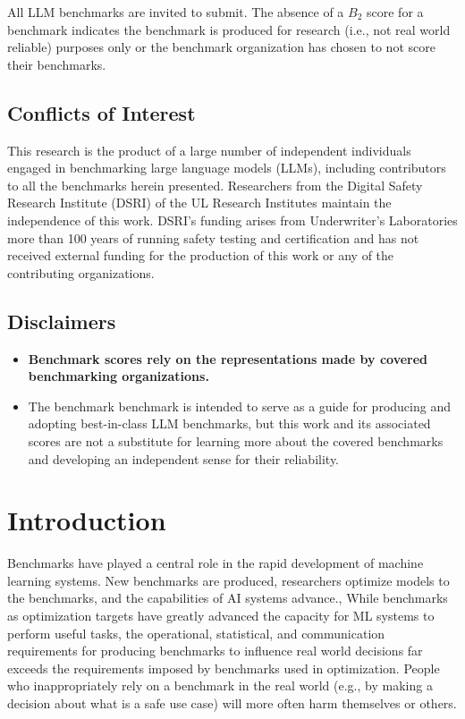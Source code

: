 \documentclass{article}
\begin{document}
All LLM benchmarks are invited to submit. The absence of a \(B_2\) score for a benchmark indicates the benchmark is produced for research (i.e., not real world reliable) purposes only or the benchmark organization has chosen to not score their benchmarks.

\subsection{Conflicts of Interest}
This research is the product of a large number of independent individuals engaged in benchmarking large language models (LLMs), including contributors to all the benchmarks herein presented. Researchers from the Digital Safety Research Institute (DSRI) of the UL Research Institutes maintain the independence of this work. DSRI's funding arises from Underwriter's Laboratories more than 100 years of running safety testing and certification and has not received external funding for the production of this work or any of the contributing organizations.

\subsection{Disclaimers}
\begin{itemize}
\item {\bf Benchmark scores rely on the representations made by covered benchmarking organizations.}
\item The benchmark benchmark is intended to serve as a guide for producing and adopting best-in-class LLM benchmarks, but this work and its associated scores are not a substitute for learning more about the covered benchmarks and developing an independent sense for their reliability.
\end{itemize}

\section{Introduction}
Benchmarks have played a central role in the rapid development of machine learning systems. New benchmarks are produced, researchers optimize models to the benchmarks, and the capabilities of AI systems advance., While benchmarks as optimization targets have greatly advanced the capacity for ML systems to perform useful tasks, the operational, statistical, and communication requirements for producing benchmarks to influence real world decisions far exceeds the requirements imposed by benchmarks used in optimization. People who inappropriately rely on a benchmark in the real world (e.g., by making a decision about what is a safe use case) will more often harm themselves or others.
\end{document}
